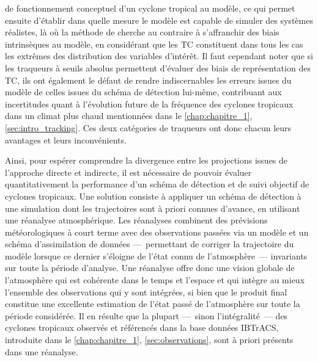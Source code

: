\documentclass[../main.tex]{subfiles}
\begin{document}
de fonctionnement conceptuel d'un cyclone tropical au modèle, ce qui permet ensuite d'établir dans quelle mesure le modèle est capable de simuler des systèmes
réalistes, là où la méthode de \cite{camargo_improving_2002} cherche au contraire à s'affranchir des biais intrinsèques au modèle, en considérant que les TC
constituent dans tous les cas les extrêmes des distribution des variables d'intérêt. Il faut cependant noter que si les traqueurs à seuils absolus permettent
d'évaluer des biais de représentation des TC, ils ont également le défaut de rendre indiscernables les erreurs issues du modèle de celles issues du schéma de
détection lui-même, contribuant aux incertitudes quant à l'évolution future de la fréquence des cyclones tropicaux dans un climat plus chaud mentionnées dans le
\cref{chap:chapitre_1}, \cref{sec:intro_tracking}. Ces deux catégories de traqueurs ont donc chacun leurs avantages et leurs inconvénients.

Ainsi, pour espérer comprendre la divergence entre les projections issues de l'approche directe et indirecte, il est nécessaire de pouvoir évaluer
quantitativement la performance d'un schéma de détection et de suivi objectif de cyclones tropicaux. Une solution consiste à appliquer un schéma de détection à
une simulation dont les trajectoires sont à priori connues d'avance, en utilisant une réanalyse atmosphérique. Les réanalyses combinent des prévisions
météorologiques à court terme avec des observations passées via un modèle et un schéma d'assimilation de données ---~permettant de corriger la trajectoire du
modèle lorsque ce dernier s'éloigne de l'état connu de l'atmosphère~--- invariants sur toute la période d'analyse. Une réanalyse offre donc une vision globale
de l'atmosphère qui est cohérente dans le temps et l'espace et qui intègre au mieux l'ensemble des observations qui y sont intégrées, si bien que le produit
final constitue une excellente estimation de l'état passé de l'atmosphère sur toute la période considérée. Il en résulte que la plupart ---~sinon
l'intégralité~--- des cyclones tropicaux observés et référencés dans la base données IBTrACS, introduite dans le \cref{chap:chapitre_1},
\cref{sec:observations}, sont à priori présents dans une réanalyse.
\end{document}
